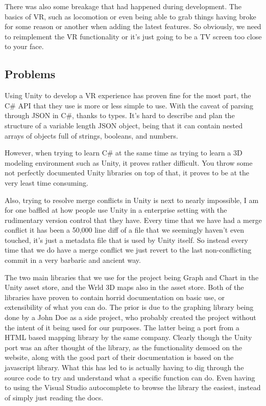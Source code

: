 \documentclass[onecolumn, draftclsnofoot,10pt, compsoc]{IEEEtran}
\begin{document}
    There was also some breakage that had happened during development. The basics of VR, such as locomotion or even being able to grab things having broke for some reason or another when adding the latest features. So obviously, we need to reimplement the VR functionality or it’s just going to be a TV screen too close to your face.

    \subsection{Problems}
    Using Unity to develop a VR experience has proven fine for the most part, the C\# API that they use is more or less simple to use. With the caveat of parsing through JSON in C\#, thanks to types. It’s hard to describe and plan the structure of a variable length JSON object, being that it can contain nested arrays of objects full of strings, booleans, and numbers.

    However, when trying to learn C\# at the same time as trying to learn a 3D modeling environment such as Unity, it proves rather difficult. You throw some not perfectly documented Unity libraries on top of that, it proves to be at the very least time consuming.

    Also, trying to resolve merge conflicts in Unity is next to nearly impossible, I am for one baffled at how people use Unity in a enterprise setting with the rudimentary version control that they have. Every time that we have had a merge conflict it has been a 50,000 line diff of a file that we seemingly haven’t even touched, it’s just a metadata file that is used by Unity itself. So instead every time that we do have a merge conflict we just revert to the last non-conflicting commit in a very barbaric and ancient way.

    The two main libraries that we use for the project being Graph and Chart in the Unity asset store, and the Wrld 3D maps also in the asset store. Both of the libraries have proven to contain horrid documentation on basic use, or extensibility of what you can do. The prior is due to the graphing library being done by a John Doe as a side project, who probably created the project without the intent of it being used for our purposes. The latter being a port from a HTML based mapping library by the same company. Clearly though the Unity port was an after thought of the library, as the functionality demoed on the website, along with the good part of their documentation is based on the javascript library. What this has led to is actually having to dig through the source code to try and understand what a specific function can do. Even having to using the Visual Studio autocomplete to browse the library the easiest, instead of simply just reading the docs.
\end{document}
